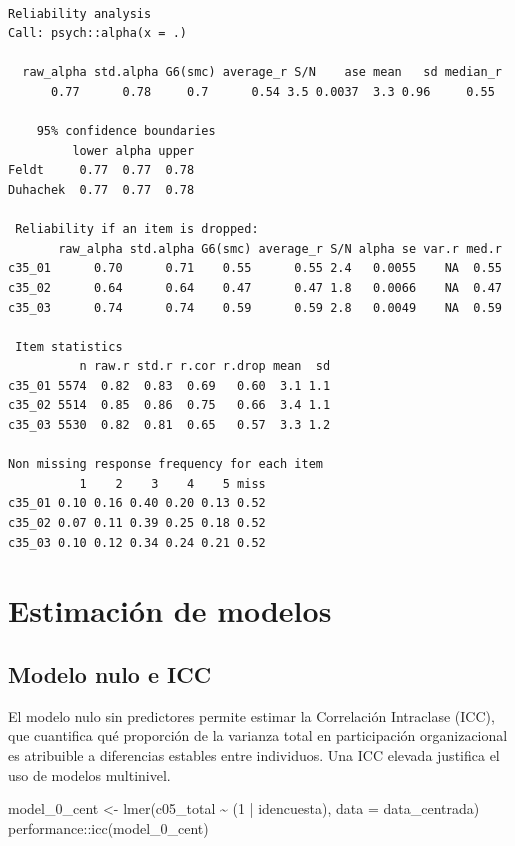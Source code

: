 \documentclass[
  spanish,
  a4paper,
  oneside]{scrbook}
\newenvironment{Shaded}{\begin{snugshade}}{\end{snugshade}}
\newcommand{\AttributeTok}[1]{\textcolor[rgb]{0.40,0.45,0.13}{#1}}
\newcommand{\DecValTok}[1]{\textcolor[rgb]{0.68,0.00,0.00}{#1}}
\newcommand{\FunctionTok}[1]{\textcolor[rgb]{0.28,0.35,0.67}{#1}}
\newcommand{\NormalTok}[1]{\textcolor[rgb]{0.00,0.23,0.31}{#1}}
\newcommand{\OtherTok}[1]{\textcolor[rgb]{0.00,0.23,0.31}{#1}}
\newcommand{\SpecialCharTok}[1]{\textcolor[rgb]{0.37,0.37,0.37}{#1}}
\begin{document}
\begin{verbatim}

Reliability analysis   
Call: psych::alpha(x = .)

  raw_alpha std.alpha G6(smc) average_r S/N    ase mean   sd median_r
      0.77      0.78     0.7      0.54 3.5 0.0037  3.3 0.96     0.55

    95% confidence boundaries 
         lower alpha upper
Feldt     0.77  0.77  0.78
Duhachek  0.77  0.77  0.78

 Reliability if an item is dropped:
       raw_alpha std.alpha G6(smc) average_r S/N alpha se var.r med.r
c35_01      0.70      0.71    0.55      0.55 2.4   0.0055    NA  0.55
c35_02      0.64      0.64    0.47      0.47 1.8   0.0066    NA  0.47
c35_03      0.74      0.74    0.59      0.59 2.8   0.0049    NA  0.59

 Item statistics 
          n raw.r std.r r.cor r.drop mean  sd
c35_01 5574  0.82  0.83  0.69   0.60  3.1 1.1
c35_02 5514  0.85  0.86  0.75   0.66  3.4 1.1
c35_03 5530  0.82  0.81  0.65   0.57  3.3 1.2

Non missing response frequency for each item
          1    2    3    4    5 miss
c35_01 0.10 0.16 0.40 0.20 0.13 0.52
c35_02 0.07 0.11 0.39 0.25 0.18 0.52
c35_03 0.10 0.12 0.34 0.24 0.21 0.52
\end{verbatim}

\chapter{Estimación de modelos}\label{estimaciuxf3n-de-modelos}

\section{Modelo nulo e ICC}\label{modelo-nulo-e-icc}

El modelo nulo sin predictores permite estimar la Correlación Intraclase
(ICC), que cuantifica qué proporción de la varianza total en
participación organizacional es atribuible a diferencias estables entre
individuos. Una ICC elevada justifica el uso de modelos multinivel.

\begin{Shaded}
\begin{Highlighting}[]
\NormalTok{model\_0\_cent }\OtherTok{\textless{}{-}} \FunctionTok{lmer}\NormalTok{(c05\_total }\SpecialCharTok{\textasciitilde{}}\NormalTok{ (}\DecValTok{1} \SpecialCharTok{|}\NormalTok{ idencuesta), }\AttributeTok{data =}\NormalTok{ data\_centrada)}
\NormalTok{performance}\SpecialCharTok{::}\FunctionTok{icc}\NormalTok{(model\_0\_cent)}
\end{Highlighting}
\end{Shaded}
\end{document}
